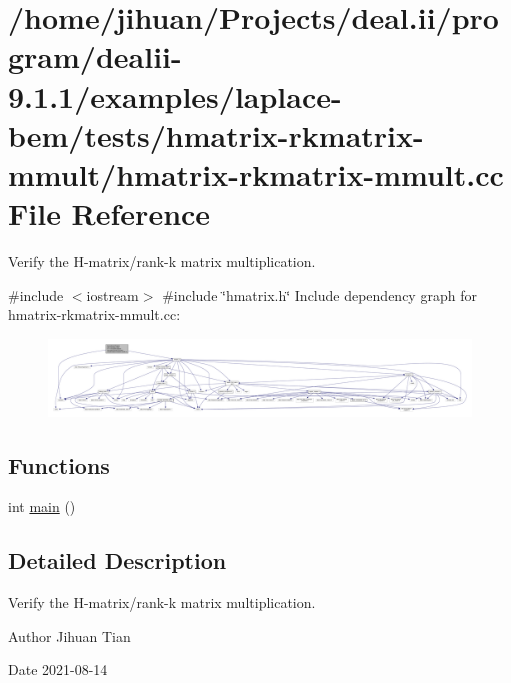 \hypertarget{hmatrix-rkmatrix-mmult_8cc}{}\section{/home/jihuan/\+Projects/deal.ii/program/dealii-\/9.1.1/examples/laplace-\/bem/tests/hmatrix-\/rkmatrix-\/mmult/hmatrix-\/rkmatrix-\/mmult.cc File Reference}
\label{hmatrix-rkmatrix-mmult_8cc}


Verify the H-\/matrix/rank-\/k matrix multiplication.  


{\ttfamily \#include $<$iostream$>$}\newline
{\ttfamily \#include \char`\"{}hmatrix.\+h\char`\"{}}\newline
Include dependency graph for hmatrix-\/rkmatrix-\/mmult.cc\+:
\nopagebreak
\begin{figure}[H]
\begin{center}
\leavevmode
\includegraphics[width=350pt]{hmatrix-rkmatrix-mmult_8cc__incl}
\end{center}
\end{figure}
\subsection*{Functions}
\begin{DoxyCompactItemize}
\item 
int \hyperlink{hmatrix-rkmatrix-mmult_8cc_ae66f6b31b5ad750f1fe042a706a4e3d4}{main} ()
\end{DoxyCompactItemize}


\subsection{Detailed Description}
Verify the H-\/matrix/rank-\/k matrix multiplication. 

\begin{DoxyAuthor}{Author}
Jihuan Tian 
\end{DoxyAuthor}
\begin{DoxyDate}{Date}
2021-\/08-\/14 
\end{DoxyDate}


